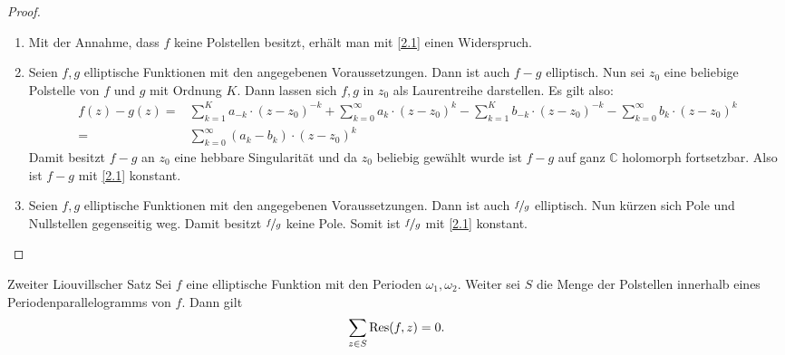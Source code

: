 \begin{proof}
\begin{enumerate}%
\item[(1)]
Mit der Annahme, dass $f$ keine Polstellen besitzt, erhält man mit \ref{2.1}
einen Widerspruch. 
\item[(2)]
Seien $f,g$ elliptische Funktionen mit den angegebenen Voraussetzungen. Dann ist auch $f-g$ elliptisch.
Nun sei $z_0$ eine beliebige Polstelle von $f$ und $g$ mit Ordnung $K$. Dann lassen sich $f,g$ in $z_0$ als Laurentreihe darstellen. Es gilt also:
\begin{align*}
f(z)-g(z)
= &\sum_{k=1}^K a_{-k} \cdot (z-z_0)^{-k} + \sum_{k=0}^\infty a_k \cdot (z-z_0)^k
- \sum_{k=1}^K b_{-k} \cdot (z-z_0)^{-k} - \sum_{k=0}^\infty b_k \cdot (z-z_0)^k\\
= &\sum_{k=0}^\infty (a_k -b_k) \cdot (z-z_0)^k
\end{align*} 
Damit besitzt $f-g$ an $z_0$ eine hebbare Singularität und da $z_0$ beliebig gewählt wurde ist $f-g$ auf ganz $\mathbb{C}$ holomorph fortsetzbar. %
Also ist $f-g$ mit \ref{2.1} konstant.  
\item[(3)]
Seien $f,g$ elliptische Funktionen mit den angegebenen Voraussetzungen. Dann ist auch $\nicefrac{f}{g}$ elliptisch.
Nun kürzen sich Pole und Nullstellen gegenseitig weg. Damit besitzt $\nicefrac{f}{g}$
keine Pole.
Somit ist $\nicefrac{f}{g}$ mit \ref{2.1} konstant.
\end{enumerate}
\end{proof}

\begin{bla}{Zweiter Liouvillscher Satz}\label{2.3}
Sei $f$ eine elliptische Funktion mit den Perioden $\omega_1,\omega_2$.
Weiter sei $S$ die Menge der Polstellen innerhalb eines Periodenparallelogramms von $f$. Dann gilt
\begin{align*}
\sum \limits_{z \in S } \operatorname{Res}(f,z) = 0.
\end{align*} 
\end{bla}

